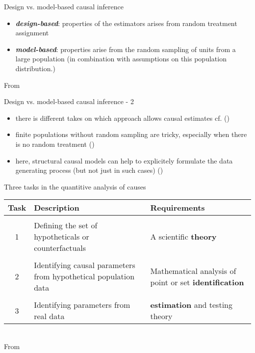 \documentclass[aspectratio=169]{beamer}
\begin{document}
	\begin{frame}{Design vs. model-based causal inference}
		\begin{itemize}
			\item \textit{\textbf{design-based}}: properties of the estimators arises from random treatment assignment
			\item \textit{\textbf{model-based}}: properties arise from the random sampling of units from a large population (in combination with assumptions on this population distribution.)
		\end{itemize}
		\vspace*{.5cm} From \cite{Athey2022}
	\end{frame}

	\begin{frame}{Design vs. model-based causal inference - 2}
		\begin{itemize}
			\item there is different takes on which approach allows causal estimates cf. (\cite{Card2022, Heckman2008})
			\item finite populations without random sampling are tricky, especially when there is no random treatment (\cite{Sterba2009, Abadie2020b})
			\item here, structural causal models can help to explicitely formulate the data generating process (but not just in such cases) (\cite{Cinelli2022})
		\end{itemize}
	\end{frame}

	\begin{frame}{Three tasks in the quantitive analysis of causes}
		\begin{centering}
			\begin{tabular}{cp{6.5cm}p{3cm}}
				Task & Description & Requirements \\
				\hline \hline \\
					1 & Defining the set of hypotheticals or counterfactuals & A scientific \textbf{theory} \\\\
					2 & Identifying causal parameters from hypothetical population data & Mathematical analysis of point or set  \textbf{identification} \\\\
					3 & Identifying parameters from real data &  \textbf{estimation} and testing theory \\
			\end{tabular}
		\end{centering}
		\\\vspace*{.5cm} From \cite{Heckman2008}
	\end{frame}
\end{document}
